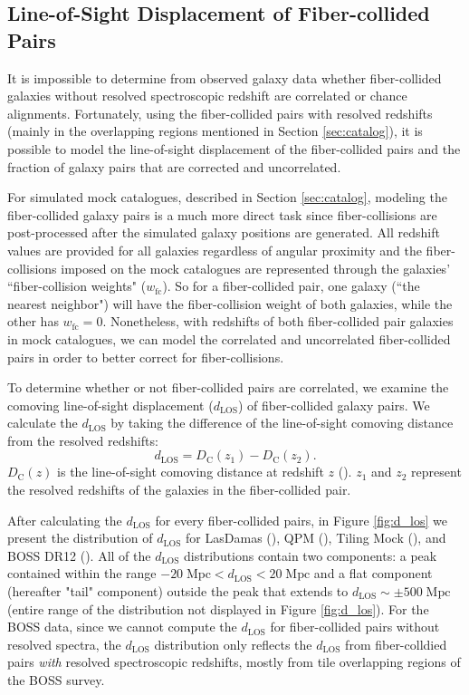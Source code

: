 \documentclass{emulateapj}
\begin{document}
\subsection{Line-of-Sight Displacement of Fiber-collided Pairs} \label{sec:dlos}
It is impossible to determine from observed galaxy data whether fiber-collided galaxies without resolved spectroscopic redshift are correlated or chance alignments. Fortunately, using the fiber-collided pairs with resolved redshifts (mainly in the overlapping regions mentioned in Section \ref{sec:catalog}), it is possible to model the line-of-sight displacement of the fiber-collided pairs and the fraction of galaxy pairs that are corrected and uncorrelated. 

For simulated mock catalogues, described in Section \ref{sec:catalog}, modeling the fiber-collided galaxy pairs is a much more direct task since fiber-collisions are post-processed after the simulated galaxy positions are generated. All redshift values are provided for all galaxies regardless of angular proximity and the fiber-collisions imposed on the mock catalogues are represented through the galaxies' ``fiber-collision weights" ($w_\mathrm{fc}$). So for a fiber-collided pair, one galaxy (``the nearest neighbor") will have the fiber-collision weight of both galaxies, while the other has $w_\mathrm{fc} = 0$. Nonetheless, with redshifts of both fiber-collided pair galaxies in mock catalogues, we can model the correlated and uncorrelated fiber-collided pairs in order to better correct for fiber-collisions. 

To determine whether or not fiber-collided pairs are correlated, we examine the comoving line-of-sight displacement ($d_{\mathrm{LOS}}$) of fiber-collided galaxy pairs. We calculate the $d_{\mathrm{LOS}}$ by taking the difference of the line-of-sight comoving distance from the resolved redshifts: 
\begin{equation}
d_{\mathrm{LOS}} = D_{\mathrm{C}} (z_1) - D_{\mathrm{C}} (z_2). 
\end{equation}
$D_{\mathrm{C}}(z)$ is the line-of-sight comoving distance at redshift $z$ (\citealt{Hogg:1999aa}). $z_1$ and $z_2$ represent the resolved redshifts of the galaxies in the fiber-collided pair.

After calculating the $d_{\mathrm{LOS}}$ for every fiber-collided pairs, in Figure \ref{fig:d_los} we present the distribution of $d_{\mathrm{LOS}}$ for LasDamas (\ldgcolor), QPM (\qpmcolor), Tiling Mock (\tmcolor), and BOSS DR12 (\cmasscolor). All of the $d_{\mathrm{LOS}}$ distributions contain two components: a peak contained within the range $-20\;\mathrm{Mpc} < d_{\mathrm{LOS}} < 20\;\mathrm{Mpc}$ and a flat component (hereafter "tail" component) outside the peak that extends to $d_{\mathrm{LOS}} \sim \pm 500 \;\mathrm{Mpc}$ (entire range of the distribution not displayed in Figure \ref{fig:d_los}). For the BOSS data, since we cannot compute the $d_\mathrm{LOS}$ for fiber-collided pairs without resolved spectra, the $d_\mathrm{LOS}$ distribution only reflects the $d_\mathrm{LOS}$ from fiber-colldied pairs {\em with} resolved spectroscopic redshifts, mostly from tile overlapping regions of the BOSS survey.
\end{document}
